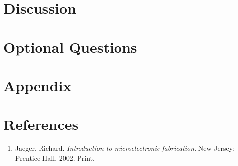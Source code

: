 \documentclass{article}
\begin{document}
\section{Discussion}


\section{Optional Questions}

\section{Appendix}
\section{References}
\begin{enumerate}
\item Jaeger, Richard. \textit{Introduction to microelectronic fabrication}. New Jersey: Prentice Hall, 2002. Print.
\end{enumerate}








\end{document}
